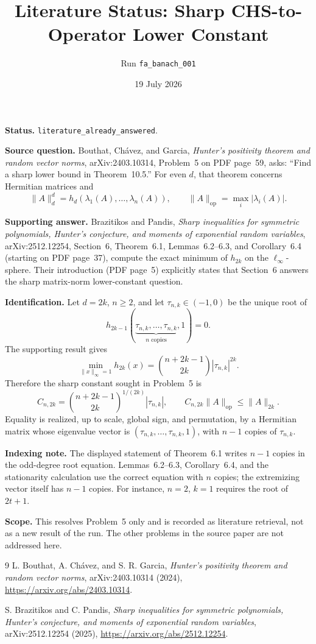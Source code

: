 \documentclass[11pt]{article}
\title{Literature Status: Sharp CHS-to-Operator Lower Constant}
\author{Run \texttt{fa\_banach\_001}}
\date{19 July 2026}
\begin{document}
\maketitle
\small

\textbf{Status.} \texttt{literature\_already\_answered}.

\textbf{Source question.} Bouthat, Ch\'avez, and Garcia,
\emph{Hunter's positivity theorem and random vector norms},
arXiv:2403.10314, Problem~5 on PDF page~59, asks: ``Find a sharp lower
bound in Theorem~10.5.'' For even $d$, that theorem concerns Hermitian
matrices and
\[
  \|A\|_d^d=h_d(\lambda_1(A),\ldots,\lambda_n(A)),
  \qquad \|A\|_{\mathrm{op}}=\max_i|\lambda_i(A)|.
\]

\textbf{Supporting answer.} Brazitikos and Pandis,
\emph{Sharp inequalities for symmetric polynomials, Hunter's conjecture,
and moments of exponential random variables}, arXiv:2512.12254, Section~6,
Theorem~6.1, Lemmas~6.2--6.3, and Corollary~6.4 (starting on PDF page~37),
compute the exact minimum of $h_{2k}$ on the $\ell_\infty$-sphere. Their
introduction (PDF page~5) explicitly states that Section~6 answers the sharp
matrix-norm lower-constant question.

\textbf{Identification.} Let $d=2k$, $n\ge2$, and let $\tau_{n,k}\in(-1,0)$
be the unique root of
\[
  h_{2k-1}(\underbrace{\tau_{n,k},\ldots,\tau_{n,k}}_{n\text{ copies}},1)=0.
\]
The supporting result gives
\[
  \min_{\|x\|_\infty=1}h_{2k}(x)
  =\binom{n+2k-1}{2k}|\tau_{n,k}|^{2k}.
\]
Therefore the sharp constant sought in Problem~5 is
\[
  \boxed{C_{n,2k}=\binom{n+2k-1}{2k}^{1/(2k)}|\tau_{n,k}|},
  \qquad C_{n,2k}\|A\|_{\mathrm{op}}\le \|A\|_{2k}.
\]
Equality is realized, up to scale, global sign, and permutation, by a
Hermitian matrix whose eigenvalue vector is
$(\tau_{n,k},\ldots,\tau_{n,k},1)$, with $n-1$ copies of $\tau_{n,k}$.

\textbf{Indexing note.} The displayed statement of Theorem~6.1 writes
$n-1$ copies in the odd-degree root equation. Lemmas~6.2--6.3,
Corollary~6.4, and the stationarity calculation use the correct equation with
$n$ copies; the extremizing vector itself has $n-1$ copies. For instance,
$n=2$, $k=1$ requires the root of $2t+1$.

\textbf{Scope.} This resolves Problem~5 only and is recorded as literature
retrieval, not as a new result of the run. The other problems in the source
paper are not addressed here.

\begin{thebibliography}{9}
L. Bouthat, A. Ch\'avez, and S. R. Garcia,
\emph{Hunter's positivity theorem and random vector norms},
arXiv:2403.10314 (2024),
\url{https://arxiv.org/abs/2403.10314}.

S. Brazitikos and C. Pandis,
\emph{Sharp inequalities for symmetric polynomials, Hunter's conjecture,
and moments of exponential random variables},
arXiv:2512.12254 (2025),
\url{https://arxiv.org/abs/2512.12254}.
\end{thebibliography}
\end{document}
